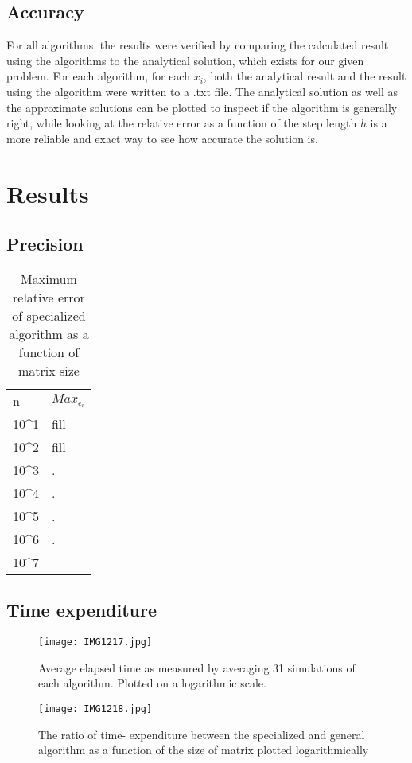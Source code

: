 \documentclass[10pt,a4paper]{article}
\begin{document}
\subsection{Accuracy}
For all algorithms, the results were verified by comparing the calculated result using the algorithms to the analytical solution, which exists for our given problem. For each algorithm, for each $x_i$, both the analytical result and the result using the algorithm were written to a .txt file. The analytical solution as well as the approximate solutions can be plotted to inspect if the algorithm is generally right, while looking at the relative error as a function of the step length $h$ is a more reliable and exact way to see how accurate the solution is. 
\section{Results}

\subsection{Precision}

\begin{table}[H]
\caption[Relative error of specialized algorithm]{Maximum relative error of specialized algorithm as a function of matrix size}
\begin{tabular}{ll}
n & $ Max_{\epsilon_i}$ \\
10^1 & fill \\
10^2 & fill \\
10^3 & . \\
10^4 & . \\
10^5 & . \\
10^6 & . \\
10^7 & 
\end{tabular}
\end{table}

\subsection{Time expenditure}

\begin{center}
\begin{figure}[H]
\texttt{[image: IMG1217.jpg]} \label{Elapsed time comparison}
	\caption[Comparing elapsed time]{Average elapsed time as measured by averaging 31 simulations of each algorithm. Plotted on a logarithmic scale.}
\end{figure}
\end{center}
\begin{center}
\begin{figure}[H]
	\texttt{[image: IMG1218.jpg]}
	\caption[Comparing general and specialized (elapsed time)]{The ratio of time- expenditure between the specialized and general algorithm as a function of the size of matrix plotted logarithmically}
\end{figure}
\end{center}
\end{document}

